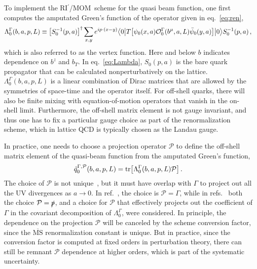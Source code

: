 \documentclass[11pt,a4paper]{article}
\DeclareRobustCommand{\eq}[1]{eq.~\eqref{eq:#1}}
\DeclareRobustCommand{\mycite}[1]{ref.~\cite{#1}}
\DeclareRobustCommand{\mycites}[1]{refs.~\cite{#1}}
\newcommand{\MS}{{\overline{\mathrm{MS}}}}
\newcommand{\cP}{\mathcal{P}}
\newcommand{\RIpMOM}{RI$^\prime$/MOM}
\begin{document}
To implement the \RIpMOM~scheme for the quasi beam function, one first computes the amputated Green's function of the operator given in \eq{ren},
\begin{align} \label{eq:Lambda}
 \Lambda^{\Gamma}_0(b, a, p, L) \equiv
 \left[S^{-1}_0(p,a)\right]^\dagger \sum_{x,y}e^{ip\cdot (x-y)}
 \big\langle 0 \big|T\bigl[\psi_0(x,a) {\cal O}_0^\Gamma(b^\mu,a,L) \bar{\psi}_0(y,a)\bigr]\big|0\big\rangle S^{-1}_0(p,a)
\,,\end{align}
which is also referred to as the vertex function. Here and below $b$ indicates dependence on $b^z$ and $b_T$.
In \eq{Lambda}, $S_0(p,a)$ is the bare quark propagator that can be calculated nonperturbatively on the lattice.
$\Lambda^{\Gamma}_0(b, a, p, L)$ is a linear combination of Dirac matrices that are allowed by the symmetries of space-time and the operator itself.
For off-shell quarks, there will also be finite mixing with equation-of-motion operators that vanish in the on-shell limit.
Furthermore, the off-shell matrix element is not gauge invariant, and thus one has to fix a particular gauge choice as part of the renormalization scheme, which in lattice QCD is typically chosen as the Landau gauge.

In practice, one needs to choose a projection operator $\cP$ to define the off-shell matrix element of the quasi-beam function from the amputated Green's function,
\begin{align} \label{eq:q}
 \tilde{q}^{\Gamma\cal, P}_0(b, a, p, L) = {\rm tr}\bigl[\Lambda^\Gamma_0(b, a, p, L) \cP\bigr]\,.
\end{align}
The choice of $\cP$ is not unique~\cite{Stewart:2017tvs,Liu:2018uuj}, but it must have overlap with $\Gamma$ to project out all the UV divergences as $a\to0$. In \mycite{Constantinou:2017sej,Constantinou:2019vyb}, the choice is ${\cP}=\Gamma$, while in \mycites{Stewart:2017tvs,Liu:2018uuj} both the choice ${\cP}=\slashed p$, and a choice for $\cP$ that effectively projects out the coefficient of $\Gamma$ in the covariant decomposition of $\Lambda^\Gamma_0$, were considered. In principle, the dependence on the projection $\cP$ will be canceled by the scheme conversion factor, since the $\MS$ renormalization constant is unique. But in practice, since the conversion factor is computed at fixed orders in perturbation theory, there can still be remnant $\cP$ dependence at higher orders, which is part of the systematic uncertainty.
\end{document}

